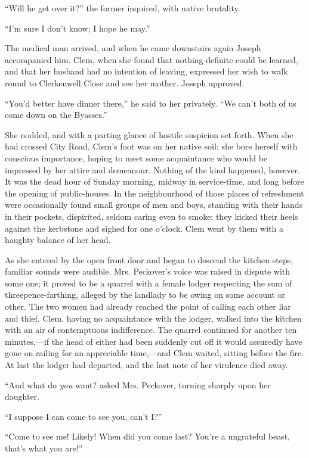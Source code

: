 ``Will he get over it?'' the former inquired, with native brutality.

``I'm sure I don't know; I hope he may.''

The medical man arrived, and when he came downstairs again Joseph
accompanied him. Clem, when she found that nothing definite could be
learned, and that her husband had no intention of leaving, expressed her
wish to walk round to Clerkenwell Close and see her mother. Joseph
approved.

{\protect\hypertarget{164}{}{}}``You'd better have dinner there,'' he
said to her privately. ``We can't both of us come down on the Byasses.''

She nodded, and with a parting glance of hostile suspicion set forth.
When she had crossed City Road, Clem's foot was on her native soil; she
bore herself with conscious importance, hoping to meet some acquaintance
who would be impressed by her attire and demeanour. Nothing of the kind
happened, however. It was the dead hour of Sunday morning, midway in
service-time, and long before the opening of public-houses. In the
neighbourhood of those places of refreshment were occasionally found
small groups of men and boys, standing with their hands in their
pockets, dispirited, seldom caring even to smoke; they kicked their
heels against the kerbstone and sighed for one o'clock. Clem went by
them with a haughty balance of her head.

As she entered by the open front door and began to descend the kitchen
steps, familiar sounds were audible. Mrs. Peckover's voice was raised in
dispute with some one; it proved to be a quarrel with a female lodger
respecting {\protect\hypertarget{165}{}{}}the sum of
threepence-farthing, alleged by the landlady to be owing on some account
or other. The two women had already reached the point of calling each
other liar and thief. Clem, having no acquaintance with the lodger,
walked into the kitchen with an air of contemptuous indifference. The
quarrel continued for another ten minutes,---if the head of either had
been suddenly cut off it would assuredly have gone on railing for an
appreciable time,---and Clem waited, sitting before the fire. At last
the lodger had departed, and the last note of her virulence died away.

``And what do \emph{you} want? asked Mrs. Peckover, turning sharply upon
her daughter.

``I suppose I can come to see you, can't I?''

``Come to see me! Likely! When did you come last? You're a ungrateful
beast, that's what you are!''

